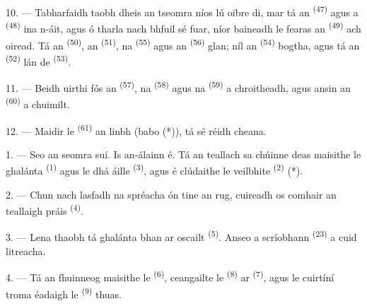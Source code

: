10. --- Tabharfaidh taobh dheis an tseomra níos lú oibre di, mar tá an
 \textsuperscript{(47)} agus a 
\textsuperscript{(48)} ina n-áit, agus ó tharla nach bhfuil sé fuar, níor baineadh
le fearas an  \textsuperscript{(49)} ach oiread. Tá an
 \textsuperscript{(50)}, an 
\textsuperscript{(51)}, na  \textsuperscript{(55)} agus an
 \textsuperscript{(56)} glan; níl an  \textsuperscript{(54)} bogtha, agus tá an 
\textsuperscript{(52)} lán de  \textsuperscript{(53)}.



11. --- Beidh uirthi fós an  \textsuperscript{(57)}, na
 \textsuperscript{(58)} agus na  \textsuperscript{(59)} a chroitheadh, agus ansin an 
\textsuperscript{(60)} a chuimilt.

12. --- Maidir le  \textsuperscript{(61)} an linbh (babo (*)), tá
sé réidh cheana.

\VUsaut{5.0mm}
\VUsaut{3.0mm}

1. --- Seo an seomra suí. Is  an-álainn é. Tá an teallach sa chúinne
deas maisithe le  ghalánta \textsuperscript{(1)} agus le dhá
 áille \textsuperscript{(3)}, agus é clúdaithe le 
veilbhite \textsuperscript{(2)} (*).

2. --- Chun nach lasfadh na spréacha ón tine an rug, cuireadh os comhair an
teallaigh  práis \textsuperscript{(4)}.

3. --- Lena thaobh tá  ghalánta bhan ar oscailt \textsuperscript{(5)}.
Anseo a scríobhann  \textsuperscript{(23)} a cuid litreacha.

4. --- Tá an fhuinneog maisithe le  \textsuperscript{(6)},
ceangailte le  \textsuperscript{(8)} ar 
\textsuperscript{(7)}, agus le cuirtíní troma éadaigh le 
\textsuperscript{(9)} thuas.

